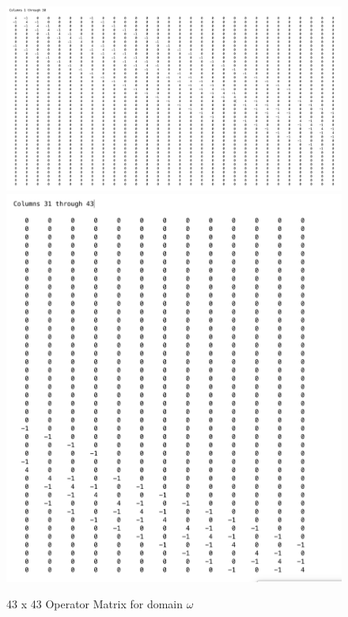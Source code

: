 \documentclass[10pt,a4paper]{article}
\begin{document}
\begin{figure}[H]
\includegraphics[width=\linewidth]{figures/rows_first.png}
\includegraphics[width=\linewidth]{figures/rows_last.png}
\caption{ 43 x 43 Operator Matrix for domain $\omega$ }
\label{fig: pdetool gaussian solutions}
\end{figure}
\end{document}

